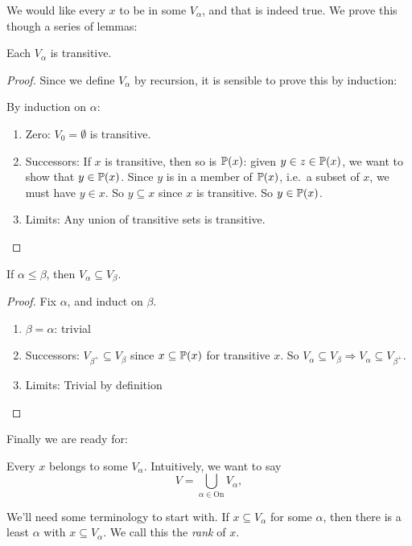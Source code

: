 \documentclass[a4paper]{article}
\begin{document}
We would like every $x$ to be in some $V_\alpha$, and that is indeed true. We prove this though a series of lemmas:

\begin{lemma}
  Each $V_\alpha$ is transitive.
\end{lemma}

\begin{proof}
  Since we define $V_\alpha$ by recursion, it is sensible to prove this by induction:

  By induction on $\alpha$:
  \begin{enumerate}
    \item Zero: $V_0 = \emptyset$ is transitive.
    \item Successors: If $x$ is transitive, then so is $\P(x)$: given $y\in z\in \P(x)$, we want to show that $y\in \P(x)$. Since $y$ is in a member of $\P(x)$, i.e.\ a subset of $x$, we must have $y\in x$. So $y\subseteq x$ since $x$ is transitive. So $y\in \P(x)$.
    \item Limits: Any union of transitive sets is transitive.\qedhere
  \end{enumerate}
\end{proof}

\begin{lemma}
  If $\alpha \leq \beta$, then $V_\alpha \subseteq V_\beta$.
\end{lemma}

\begin{proof}
  Fix $\alpha$, and induct on $\beta$.
  \begin{enumerate}
    \item $\beta = \alpha$: trivial
    \item Successors: $V_{\beta^+}\subseteq V_\beta$ since $x\subseteq \P(x)$ for transitive $x$. So $V_\alpha \subseteq V_\beta \Rightarrow V_\alpha \subseteq V_{\beta^+}$.
    \item Limits: Trivial by definition\qedhere
  \end{enumerate}
\end{proof}

Finally we are ready for:
\begin{thm}
  Every $x$ belongs to some $V_\alpha$. Intuitively, we want to say
  \[
    V = \bigcup_{\alpha \in \mathrm{On}} V_\alpha,
  \]
\end{thm}
We'll need some terminology to start with. If $x\subseteq V_\alpha$ for some $\alpha$, then there is a least $\alpha$ with $x\subseteq V_\alpha$. We call this the \emph{rank} of $x$.
\end{document}
